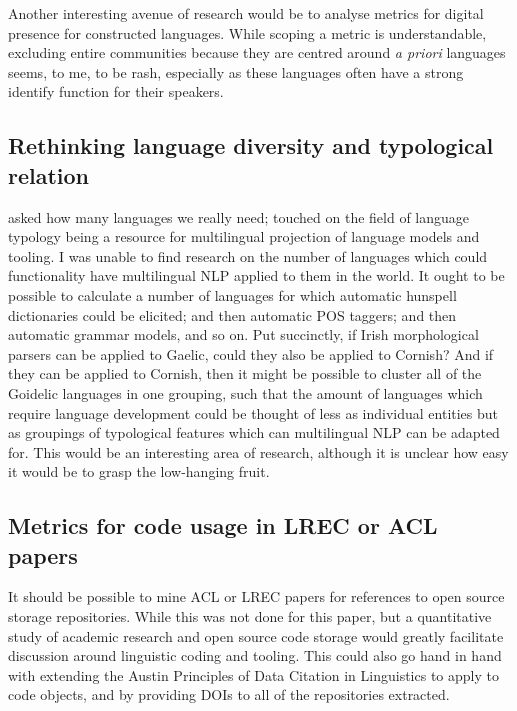 Another interesting avenue of research would be to analyse metrics for digital presence for constructed languages. While scoping a metric is understandable, excluding entire communities because they are centred around \textit{a priori} languages seems, to me, to be rash, especially as these languages often have a strong identify function for their speakers.

\subsection{Rethinking language diversity and typological relation}

\citet{ginsburgh2011many} asked how many languages we really need; \citet{bender2010grand, bender2016linguistic} touched on the field of language typology being a resource for multilingual projection of language models and tooling. I was unable to find research on the number of languages which could functionality have multilingual NLP applied to them in the world. It ought to be possible to calculate a number of languages for which automatic hunspell dictionaries could be elicited; and then automatic POS taggers; and then automatic grammar models, and so on. Put succinctly, if Irish morphological parsers can be applied to Gaelic, could they also be applied to Cornish? And if they can be applied to Cornish, then it might be possible to cluster all of the Goidelic languages in one grouping, such that the amount of languages which require language development could be thought of less as individual entities but as groupings of typological features which can multilingual NLP can be adapted for. This would be an interesting area of research, although it is unclear how easy it would be to grasp the low-hanging fruit.

\subsection{Metrics for code usage in LREC or ACL papers}

It should be possible to mine ACL or LREC papers for references to open source storage repositories. While this was not done for this paper, but a quantitative study of academic research and open source code storage would greatly facilitate discussion around linguistic coding and tooling. This could also go hand in hand with extending the Austin Principles of Data Citation in Linguistics \citet{AustinPrinciples2017} to apply to code objects, and by providing DOIs to all of the repositories extracted.

